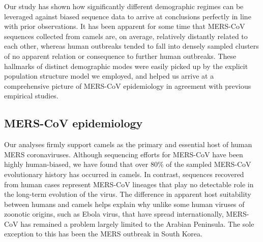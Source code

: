 \documentclass[11pt,oneside,letterpaper]{article}
\begin{document}
Our study has shown how significantly different demographic regimes can be leveraged against biased sequence data to arrive at conclusions perfectly in line with prior observations.
It has been apparent for some time that MERS-CoV sequences collected from camels are, on average, relatively distantly related to each other, whereas human outbreaks tended to fall into densely sampled clusters of no apparent relation or consequence to further human outbreaks.
These hallmarks of distinct demographic modes were easily picked up by the explicit population structure model we employed, and helped us arrive at a comprehensive picture of MERS-CoV epidemiology in agreement with previous empirical studies.


\subsection*{MERS-CoV epidemiology}
Our analyses firmly support camels as the primary and essential host of human MERS coronaviruses.
Although sequencing efforts for MERS-CoV have been highly human-biased, we have found that over 80\% of the sampled MERS-CoV evolutionary history has occurred in camels.
In contrast, sequences recovered from human cases represent MERS-CoV lineages that play no detectable role in the long-term evolution of the virus.
The difference in apparent host suitability between humans and camels helps explain why unlike some human viruses of zoonotic origins, such as Ebola virus, that have spread internationally, MERS-CoV has remained a problem largely limited to the Arabian Peninsula.
The sole exception to this has been the MERS outbreak in South Korea.




\end{document}
